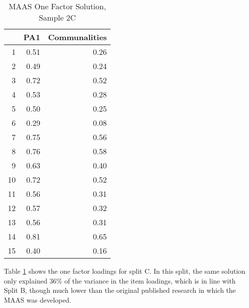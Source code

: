 \documentclass{article}
\begin{document}
\begin{table}[ht]
\centering
\begin{tabular}{rrr}
  \hline
 & PA1 & Communalities \\ 
  \hline
1 & 0.51 & 0.26 \\ 
  2 & 0.49 & 0.24 \\ 
  3 & 0.72 & 0.52 \\ 
  4 & 0.53 & 0.28 \\ 
  5 & 0.50 & 0.25 \\ 
  6 & 0.29 & 0.08 \\ 
  7 & 0.75 & 0.56 \\ 
  8 & 0.76 & 0.58 \\ 
  9 & 0.63 & 0.40 \\ 
  10 & 0.72 & 0.52 \\ 
  11 & 0.56 & 0.31 \\ 
  12 & 0.57 & 0.32 \\ 
  13 & 0.56 & 0.31 \\ 
  14 & 0.81 & 0.65 \\ 
  15 & 0.40 & 0.16 \\ 
   \hline
\end{tabular}
\caption{MAAS One Factor Solution, Sample 2C} 
\label{tab:maas2cfact1}
\end{table}
Table \ref{tab:maas2cfact1} shows the one factor loadings for split C. In this split, the same solution only explained 36\% of the variance in the item loadings, which is in line with Split B, though much lower than the original published research in which the MAAS was developed. 
\end{document}
